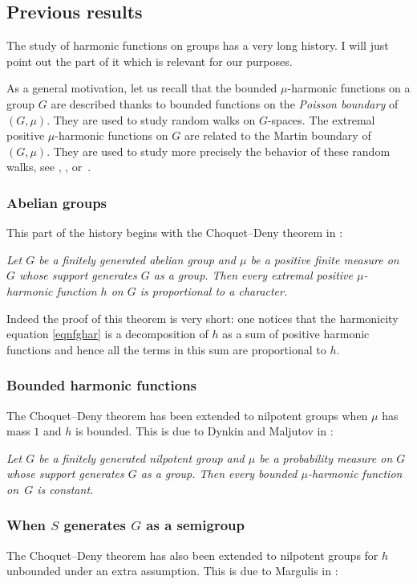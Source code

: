 \documentclass[JEP,XML,SOM,Unicode]{cedram}
\theoremstyle{definition}
\let\bq\relax
\let\eq\relax
\begin{document}
\subsection{Previous results}
\label{secpreres}
\bq
The study of harmonic functions on groups has a very long history. I will just point out the part of it which is relevant
for our purposes.
\eq

As a general motivation, let us recall that
the bounded $\mu$-harmonic functions on a group $G$
are described thanks
to bounded functions on the \emph{Poisson boundary} of $(G,\mu)$.
They are used to study
random walks on $G$-spaces.
The extremal positive $\mu$\nobreakdash-harmonic functions on $G$
are related to the Martin boundary of $(G,\mu)$.
They are used to study
more precisely the behavior of these random walks,
see \cite{Ancona90}, \cite{Gouezel15}, \cite{Sawyer97} or~\cite{Woess00}.

\subsubsection{Abelian groups}
This part of the history begins with the Choquet--Deny theorem
in \cite{ChoquetDeny60}:

\emph{Let $G$ be a finitely generated abelian group and
$\mu$ be a
positive finite measure on~$G$
whose support generates $G$ as a group.
Then every extremal positive $\mu$-harmonic function
$h$ on $G$ is proportional to a character.}

Indeed the proof of this theorem is very short:
one notices that the harmonicity equation \eqref{eqnfghar}
is a decomposition of $h$ as a sum of positive harmonic functions
and hence all the terms in this sum are proportional to $h$.

\subsubsection{Bounded harmonic functions}
The Choquet--Deny theorem has been extended to nilpotent
groups when $\mu$ has mass $1$
and $h$ is bounded. This is due to
Dynkin and Maljutov in \cite{DynkinMaljutov61}:

\emph{Let $G$ be a finitely generated nilpotent group
and $\mu$ be a probability measure on $G$
whose support generates $G$ as a group.
Then every bounded $\mu$-harmonic
function on~$G$ is constant.}

\subsubsection{When $S$ generates $G$ as a semigroup}
The Choquet--Deny theorem has also been extended to nilpotent
groups for $h$ unbounded under an extra assumption.
This is due to Margulis in \cite{Margulis66}:
\end{document}
